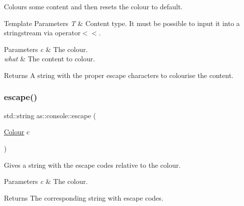 Colours some content and then resets the colour to default. 


\begin{DoxyTemplParams}{Template Parameters}
{\em T} & Content type. It must be possible to input it into a stringstream via operator$<$$<$. \\
\hline
\end{DoxyTemplParams}

\begin{DoxyParams}{Parameters}
{\em c} & The colour. \\
\hline
{\em what} & The content to colour. \\
\hline
\end{DoxyParams}
\begin{DoxyReturn}{Returns}
A string with the proper escape characters to colourise the content. 
\end{DoxyReturn}
\mbox{\label{namespaceas_1_1console_a960fbc86f1ff964059acb44b12342199}} 
\subsubsection{\texorpdfstring{escape()}{escape()}}
{\footnotesize\ttfamily std\+::string as\+::console\+::escape (\begin{DoxyParamCaption}\item[{\hyperlink{namespaceas_1_1console_ab2f5a531e43f4ee9e0f348f8aa5ce16c}{Colour}}]{c }\end{DoxyParamCaption})\hspace{0.3cm}{\ttfamily [inline]}}



Gives a string with the escape codes relative to the colour. 


\begin{DoxyParams}{Parameters}
{\em c} & The colour. \\
\hline
\end{DoxyParams}
\begin{DoxyReturn}{Returns}
The corresponding string with escape codes. 
\end{DoxyReturn}
\mbox{\label{namespaceas_1_1console_a05dafe6fcc36510443d4769ad4667652}} 
